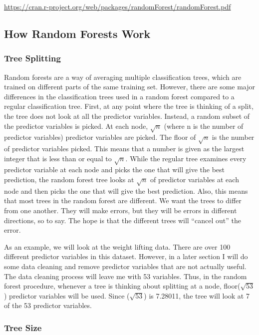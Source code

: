 \documentclass[12pt,twoside]{reedthesis}
\begin{document}
  \url{https://cran.r-project.org/web/packages/randomForest/randomForest.pdf}
  
  \subsection{How Random Forests Work}\label{how-random-forests-work}
  
  \subsubsection{Tree Splitting}\label{tree-splitting}
  
  Random forests are a way of averaging multiple classification trees,
  which are trained on different parts of the same training set. However,
  there are some major differences in the classification trees used in a
  random forest compared to a regular classification tree. First, at any
  point where the tree is thinking of a split, the tree does not look at
  all the predictor variables. Instead, a random subset of the predictor
  variables is picked. At each node, \(\sqrt{n}\) (where n is the number
  of predictor variables) predictor variables are picked. The floor of
  \(\sqrt{n}\) is the number of predictor variables picked. This means
  that a number is given as the largest integer that is less than or equal
  to \(\sqrt{n}\). While the regular tree examines every predictor
  variable at each node and picks the one that will give the best
  prediction, the random forest tree looks at \(\sqrt{n}\) of predictor
  variables at each node and then picks the one that will give the best
  prediction. Also, this means that most trees in the random forest are
  different. We want the trees to differ from one another. They will make
  errors, but they will be errors in different directions, so to say. The
  hope is that the different trees will ``cancel out'' the error.
  
  As an example, we will look at the weight lifting data. There are over
  100 different predictor variables in this dataset. However, in a later
  section I will do some data cleaning and remove predictor variables that
  are not actually useful. The data cleaning process will leave me with 53
  variables. Thus, in the random forest procedure, whenever a tree is
  thinking about splitting at a node, floor(\(\sqrt{53}\)) predictor
  variables will be used. Since (\(\sqrt{53}\)) is 7.28011, the tree will
  look at 7 of the 53 predictor variables.
  
  \subsubsection{Tree Size}\label{tree-size}
  
\end{document}
